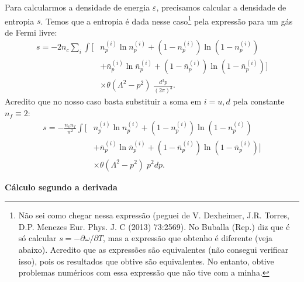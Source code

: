 Para calcularmos a densidade de energia $\varepsilon$, precisamos calcular a densidade de entropia $s$. Temos que a entropia é dada nesse caso\footnote{Não sei como chegar nessa expressão (peguei de V. Dexheimer, J.R. Torres, D.P. Menezes Eur. Phys. J. C (2013) 73:2569). No Buballa (Rep.) diz que é só calcular $s = -\partial\omega/\partial T$, mas a expressão que obtenho é diferente (veja abaixo). Acredito que as expressões são equivalentes (não consegui verificar isso), pois os resultados que obtive são equivalentes. No entanto, obtive problemas numéricos com essa expressão que não tive com a minha.} pela expressão para um gás de Fermi livre:
\begin{equation}\label{Eq:Densidade_de_entropia_art}
\begin{split}
	s = -2 n_c \sum_i \int [&n_p^{(i)} \ln n_p^{(i)} + (1 - n_p^{(i)}) \ln(1-n_p^{(i)}) \\
	&+ \bar{n}_p^{(i)} \ln \bar{n}_p^{(i)} + (1-\bar{n}_p^{(i)})\ln(1-\bar{n}_p^{(i)})] \\
	&\times\theta(\Lambda^2 - p^2)\;\frac{d^3p}{(2\pi)^3}.
\end{split}
\end{equation}
%
Acredito que no nosso caso basta substituir a soma em $i = u, d$ pela constante $n_f \equiv 2$:
\begin{equation}
\begin{split}
	s = - \frac{n_c n_f}{\pi^2} \int [&n_p^{(i)} \ln n_p^{(i)} + (1 - n_p^{(i)}) \ln(1-n_p^{(i)}) \\
	&+ \bar{n}_p^{(i)} \ln \bar{n}_p^{(i)} + (1-\bar{n}_p^{(i)})\ln(1-\bar{n}_p^{(i)})] \\
	&\times\theta(\Lambda^2 - p^2) \; p^2 dp.
\end{split}
\end{equation}

\textbf{Cálculo segundo a derivada}

